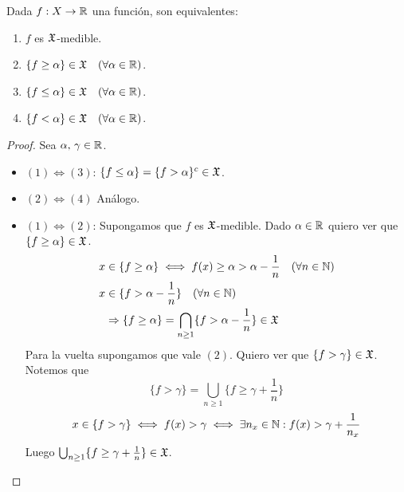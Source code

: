 \begin{lemma}
    Dada $f: X \to \mathbb{R}$ una función, son equivalentes:
    \begin{enumerate}
        \item $f$ es $\mathfrak{X}$-medible.
        \item $\{ f \geq \alpha \} \in \mathfrak{X} \quad (\forall \alpha \in \mathbb{R})$.
        \item $\{ f \leq \alpha \} \in \mathfrak{X} \quad (\forall \alpha \in \mathbb{R})$.
        \item $\{ f < \alpha \} \in \mathfrak{X} \quad (\forall \alpha \in \mathbb{R})$.
    \end{enumerate}

    \begin{proof}
        Sea $\alpha \text{, } \gamma \in \mathbb{R}$.
        \begin{itemize}
            \item $(1) \iff (3)$: $\{ f \leq \alpha \} = \{ f > \alpha \}^c \in \mathfrak{X}$.
            \item $(2) \iff (4)$ Análogo.
            \item $(1) \iff (2)$: Supongamos que $f$ es $\mathfrak{X}$-medible. Dado $\alpha \in \mathbb{R}$ quiero ver que $\{ f \geq \alpha \} \in \mathfrak{X}$.
                  \begin{align*}
                      x & \in \{ f \geq \alpha \} \iff f(x) \geq \alpha > \alpha - \frac{1}{n} \quad (\forall n \in \mathbb{N})  \\
                      x & \in \{ f > \alpha - \frac{1}{n} \} \quad (\forall n \in \mathbb{N})                                    \\
                        & \Rightarrow \{ f \geq \alpha \} = \bigcap_{n \geq 1} \{ f > \alpha - \frac{1}{n} \} \in \mathfrak{X}
                  \end{align*}
                  Para la vuelta supongamos que vale $(2)$. Quiero ver que $\{ f > \gamma \} \in \mathfrak{X}$. Notemos que
                  \begin{equation*}
                      \{ f > \gamma \} = \bigcup_{n \geq 1} \{ f \geq \gamma + \frac{1}{n} \}
                  \end{equation*}
                  \begin{equation*}
                      x \in \{ f > \gamma \} \iff f(x) > \gamma \iff \exists n_x \in \mathbb{N} : f(x) > \gamma + \frac{1}{n_x}
                  \end{equation*}
                  Luego $\bigcup_{n \geq 1} \{ f \geq \gamma + \frac{1}{n} \} \in \mathfrak{X}$.
        \end{itemize}
    \end{proof}
\end{lemma}

